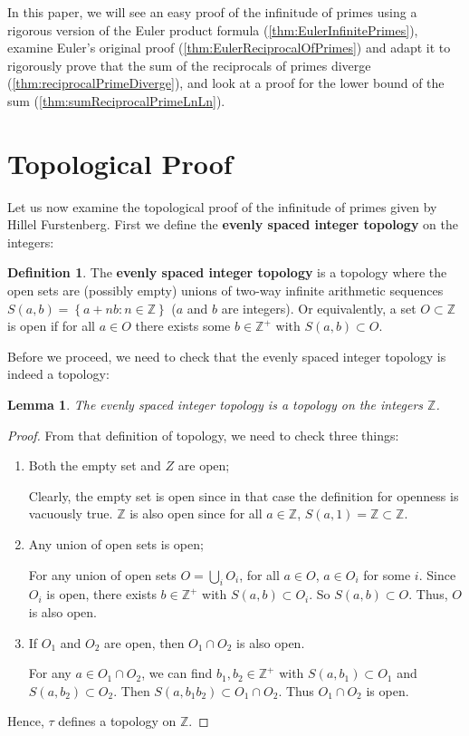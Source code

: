 \documentclass[a4paper]{article}
\newtheorem{lemma}[theorem]{Lemma}
\theoremstyle{definition}
\newtheorem{definition}{Definition}[section]
\theoremstyle{remark}
\begin{document}
In this paper, we will see an easy proof of the infinitude of primes using a rigorous version of the Euler product formula (\cref{thm:EulerInfinitePrimes}), examine Euler's original proof (\cref{thm:EulerReciprocalOfPrimes}) and adapt it to rigorously prove that the sum of the reciprocals of primes diverge (\cref{thm:reciprocalPrimeDiverge}), and look at a proof for the lower bound of the sum (\cref{thm:sumReciprocalPrimeLnLn}).
\section{Topological Proof}
\label{sec:topological}
Let us now examine the topological proof of the infinitude of primes given by Hillel Furstenberg.
First we define the \textbf{evenly spaced integer topology} on the integers:
\begin{definition}
  The \textbf{evenly spaced integer topology} is a topology where the open sets are (possibly empty) unions of two-way infinite arithmetic sequences $S(a,b)=\left\{ a+nb:n\in\mathbb{Z} \right\}$ ($a$ and $b$ are integers). Or equivalently, a set $O\subset\mathbb{Z}$ is open if for all $a\in O$ there exists some $b\in\mathbb{Z^+}$ with $S(a,b)\subset O$.
  \label{def:esip}
\end{definition}
Before we proceed, we need to check that the evenly spaced integer topology is indeed a topology:
\begin{lemma}
  The evenly spaced integer topology is a topology on the integers $\mathbb{Z}$.
  \label{lem:esip}
\end{lemma}
\begin{proof}
  From that definition of topology, we need to check three things:
  \begin{enumerate}
    \item Both the empty set and $Z$ are open;

      Clearly, the empty set is open since in that case the definition for openness is vacuously true. $\mathbb{Z}$ is also open since for all $a\in\mathbb{Z}$, $S(a,1)=\mathbb{Z}\subset\mathbb{Z}$.
    \item Any union of open sets is open;

      For any union of open sets $O=\bigcup\limits_i O_i$, for all $a\in O$, $a\in O_i$ for some $i$. Since $O_i$ is open, there exists $b\in\mathbb{Z^+}$ with $S(a,b)\subset O_i$. So $S(a,b)\subset O$. Thus, $O$ is also open.
    \item If $O_1$ and $O_2$ are open, then $O_1\cap O_2$ is also open.

      For any $a\in O_1\cap O_2$, we can find $b_1,b_2\in\mathbb{Z^+}$ with $S(a,b_1)\subset O_1$ and $S(a,b_2)\subset O_2$. Then $S(a,b_1b_2)\subset O_1\cap O_2$. Thus $O_1\cap O_2$ is open.

  \end{enumerate}
  Hence, $\tau$ defines a topology on $\mathbb{Z}$.
\end{proof}
\end{document}
